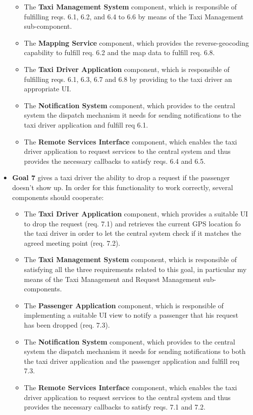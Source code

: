 \begin{itemize}
	\begin{itemize}
	\item The \textbf{Taxi Management System} component, which is responsible of fulfilling reqs. 6.1, 6.2, and 6.4 to 6.6 by means of the Taxi Management sub-component.
	\item The \textbf{Mapping Service} component, which provides the reverse-geocoding capability to fulfill req. 6.2 and the map data to fulfill req. 6.8.
	\item The \textbf{Taxi Driver Application} component, which is responsible of fulfilling reqs. 6.1, 6.3, 6.7 and 6.8 by providing to the taxi driver an appropriate UI.
	\item The \textbf{Notification System} component, which provides to the central system the dispatch mechanism it needs for sending notifications to the taxi driver application and fulfill req 6.1.
	\item The \textbf{Remote Services Interface} component, which enables the taxi driver application to request services to the central system and thus provides the necessary callbacks to satisfy reqs. 6.4 and 6.5.
	\end{itemize}
	\item \textbf{Goal 7} gives a taxi driver the ability to drop a request if the passenger doesn't show up. In order for this functionality to work correctly, several components should cooperate:
	\begin{itemize}
	\item The \textbf{Taxi Driver Application} component, which provides a suitable UI to drop the request (req. 7.1) and retrieves the current GPS location fo the taxi driver in order to let the central system check if it matches the agreed meeting point (req. 7.2).
	\item The \textbf{Taxi Management System} component, which is responsible of satisfying all the three requirements related to this goal, in particular my means of the Taxi Management and Request Management sub-components.
	\item The \textbf{Passenger Application} component, which is responsible of implementing a suitable UI view to notify a passenger that his request has been dropped (req. 7.3).
	\item The \textbf{Notification System} component, which provides to the central system the dispatch mechanism it needs for sending notifications to both the taxi driver application and the passenger application and fulfill req 7.3.
	\item The \textbf{Remote Services Interface} component, which enables the taxi driver application to request services to the central system and thus provides the necessary callbacks to satisfy reqs. 7.1 and 7.2.

\end{itemize}
\end{itemize}
